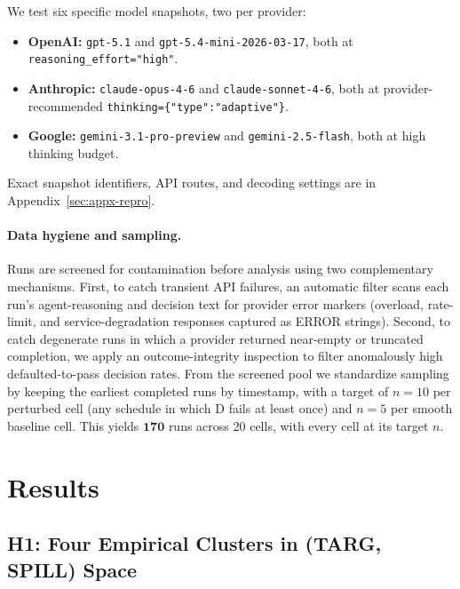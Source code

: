 \documentclass{article}
\begin{document}
We test six specific model snapshots, two per provider:

\begin{itemize}[leftmargin=*, itemsep=1pt, topsep=2pt]
  \item \textbf{OpenAI:} \texttt{gpt-5.1} and \texttt{gpt-5.4-mini-2026-03-17}, both at \texttt{reasoning\_effort="high"}.
  \item \textbf{Anthropic:} \texttt{claude-opus-4-6} and \texttt{claude-sonnet-4-6}, both at provider-recommended \texttt{thinking=\{"type":"adaptive"\}}.
  \item \textbf{Google:} \texttt{gemini-3.1-pro-preview} and \texttt{gemini-2.5-flash}, both at high thinking budget.
\end{itemize}

Exact snapshot identifiers, API routes, and decoding settings are in Appendix~\ref{sec:appx-repro}.

\paragraph{Data hygiene and sampling.} Runs are screened for contamination before analysis using two complementary mechanisms. First, to catch transient API failures, an automatic filter scans each run's agent-reasoning and decision text for provider error markers (overload, rate-limit, and service-degradation responses captured as ERROR strings). Second, to catch degenerate runs in which a provider returned near-empty or truncated completion, we apply an outcome-integrity inspection to filter anomalously high defaulted-to-pass decision rates. From the screened pool we standardize sampling by keeping the earliest completed runs by timestamp, with a target of $n=10$ per perturbed cell (any schedule in which D fails at least once) and $n=5$ per smooth baseline cell. This yields $\mathbf{170}$ runs across 20 cells, with every cell at its target $n$.

\section{Results}
\label{sec:results}

\subsection{H1: Four Empirical Clusters in (TARG, SPILL) Space}
\label{sec:h1}
\end{document}
